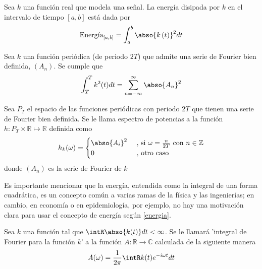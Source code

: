 \begin{defn}
Sea $k$ una funci\'on real que modela una se\~nal. La energ\'ia disipada por $k$ en el intervalo de
tiempo $[a,b]$ est\'a dada por
\begin{equation*}
\text{Energ\'ia}_{[a,b]} = \int_{a}^{b} \abso{k\left(t\right)}^{2} dt
\end{equation*}
\label{energia}
\end{defn}

\begin{thrm}
Sea $k$ una funci\'on peri\'odica (de periodo $2T$) que admite una serie de Fourier bien definida,
$(A_n)$. Se cumple que
\begin{equation*}
\int_T^{T} k^{2}(t) dt = \sum_{n=-\infty}^{\infty} \abso{A_n}^{2}
\end{equation*}
\label{parseval_serie}
\end{thrm}


\begin{defn}
Sea $P_T$ el espacio de las funciones peri\'odicas con periodo $2T$ que tienen una serie de Fourier 
bien definida. Se le llama espectro de potencias a la funci\'on 
$h: P_T \times \mathbb{R} \mapsto \mathbb{R}$ definida como
\begin{equation*}
h_k(\omega) = 
\begin{cases}
\abso{A_i}^{2} & \text{ , si } \omega = \frac{n}{2T} \text{   con } n\in \mathbb{Z} \\
0 & \text{ ,  otro caso}
\end{cases}
\end{equation*}
donde $\left( A_n \right)$ es la serie de Fourier de $k$
\label{espec}
\end{defn}

Es importante mencionar que la energ\'ia, entendida como la integral de una forma cuadr\'atica, es 
un concepto com\'un a varias ramas de la f\'isica y las ingenier\'ias; en cambio, en econom\'ia o 
en epidemiolog\'ia, por ejemplo, no hay una motivaci\'on clara para usar el concepto de energ\'ia 
seg\'un \ref{energia}.

\begin{defn}
Sea $k$ una funci\'on tal que $\intR \abso{k(t)} dt < \infty$. Se le llamar\'a 'integral de 
Fourier para la funci\'on $k$' a la funci\'on $A:\mathbb{R}\rightarrow \mathbb{C}$ calculada de la 
siguiente manera
\begin{equation*}
A(\omega) = \frac{1}{2 \pi} \intR k(t) e^{- i \omega t} dt
\end{equation*}
\label{fourier_int}
\end{defn}

